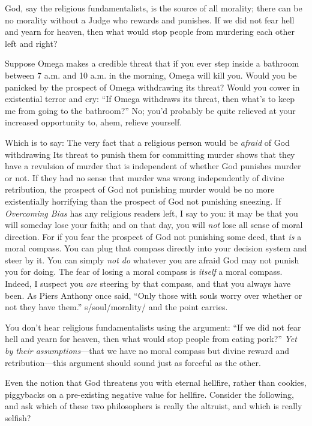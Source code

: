 
{
 God, say the religious fundamentalists, is the source of all
morality; there can be no morality without a Judge who rewards and
punishes. If we did not fear hell and yearn for heaven, then what would
stop people from murdering each other left and right? }

{
 Suppose Omega makes a credible threat that if you ever step inside
a bathroom between 7 a.m. and 10 a.m. in the morning, Omega will kill
you. Would you be panicked by the prospect of Omega withdrawing its
threat? Would you cower in existential terror and cry:
``If Omega withdraws its threat, then
what's to keep me from going to the
bathroom?'' No; you'd probably be
quite relieved at your increased opportunity to, ahem, relieve
yourself.}

{
 Which is to say: The very fact that a religious person would be
\textit{afraid} of God withdrawing Its threat to punish them for
committing murder shows that they have a revulsion of murder that is
independent of whether God punishes murder or not. If they had no sense
that murder was wrong independently of divine retribution, the prospect
of God not punishing murder would be no more existentially horrifying
than the prospect of God not punishing sneezing. If \textit{Overcoming
Bias} has any religious readers left, I say to you: it may be that you
will someday lose your faith; and on that day, you will \textit{not}
lose all sense of moral direction. For if you fear the prospect of God
not punishing some deed, that \textit{is} a moral compass. You can plug
that compass directly into your decision system and steer by it. You
can simply \textit{not do} whatever you are afraid God may not punish
you for doing. The fear of losing a moral compass is \textit{itself} a
moral compass. Indeed, I suspect you \textit{are} steering by that
compass, and that you always have been. As Piers Anthony once said,
``Only those with souls worry over whether or not they
have them.'' s/soul/morality/ and the point carries.}

{
 You don't hear religious fundamentalists using the
argument: ``If we did not fear hell and yearn for
heaven, then what would stop people from eating
pork?'' \textit{Yet by their assumptions}{}---that we
have no moral compass but divine reward and retribution---this argument
should sound just as forceful as the other.}

{
 Even the notion that God threatens you with eternal hellfire,
rather than cookies, piggybacks on a pre-existing negative value for
hellfire. Consider the following, and ask which of these two
philosophers is really the altruist, and which is really selfish?}

